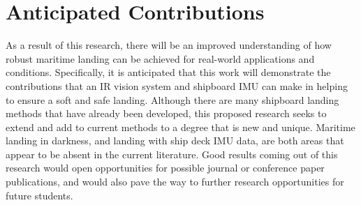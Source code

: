 \documentclass[12pt, letterpaper]{article}
\begin{document}
\section{Anticipated Contributions}

As a result of this research, there will be an improved understanding of how robust maritime landing can be achieved for real-world applications and conditions.  Specifically, it is anticipated that this work will demonstrate the contributions that an IR vision system and shipboard IMU can make in helping to ensure a soft and safe landing. Although there are many shipboard landing methods that have already been developed, this proposed research seeks to extend and add to current methods to a degree that is new and unique.  Maritime landing in darkness, and landing with ship deck IMU data, are both areas that appear to be absent in the current literature. Good results coming out of this research would open opportunities for possible journal or conference paper publications, and would also pave the way to further research opportunities for future students.    


\pagebreak



\end{document}
